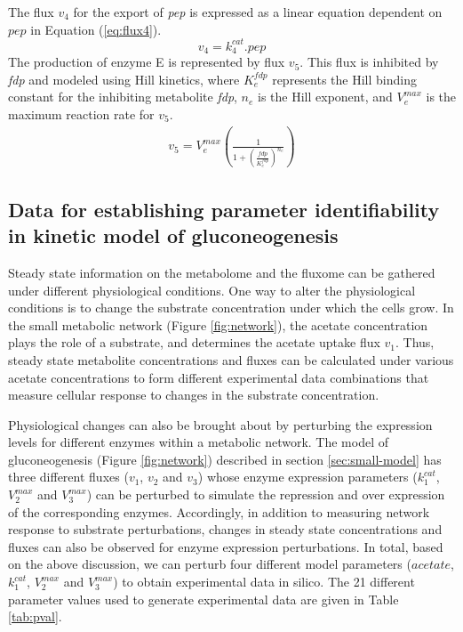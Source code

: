 \documentclass[10pt]{article}
\begin{document}
	The flux $v_4$ for the export of \textit{pep} is expressed as a linear equation dependent on $pep$ in Equation (\ref{eq:flux4}).
	\begin{equation}\label{eq:flux4}
	v_4 = k_{4}^{cat}.pep
	\end{equation}		
	The production of enzyme E is represented by flux $v_5$. This flux is inhibited by \textit{fdp} and modeled using Hill kinetics, where $K_e^{fdp}$ represents the Hill binding constant for the inhibiting metabolite \textit{fdp}, $n_e$ is the Hill exponent, and $V_e^{max}$ is the maximum reaction rate for $v_5$.
	\begin{align}\label{eq:flux5}
	v_5 = V_e^{max}\left(\frac{1}{1+\left(\frac{fdp}{K_{e}^{fdp}}\right)^{n_e}}\right)
	\end{align}
	
	\subsection{Data for establishing parameter identifiability in kinetic model of gluconeogenesis}\label{sec:experiments}
	Steady state information on the metabolome and the fluxome can be gathered under different physiological conditions. One way to alter the physiological conditions is to change the substrate concentration under which the cells grow. In the small metabolic network (Figure \ref{fig:network}), the acetate concentration plays the role of a substrate, and  determines the acetate uptake flux $v_1$. Thus, steady state metabolite concentrations and fluxes can be calculated under various acetate concentrations to form different experimental data combinations that measure cellular response to changes in the substrate concentration. 
	
	Physiological changes can also be brought about by perturbing the expression levels for different enzymes within a metabolic network. The model of gluconeogenesis (Figure \ref{fig:network}) described in section \ref{sec:small-model} has three different fluxes ($v_1$, $v_2$ and $v_3$) whose enzyme expression parameters ($k_1^{cat}$, $V_2^{max}$ and $V_3^{max}$) can be perturbed to simulate the repression and over expression of the corresponding enzymes. Accordingly, in addition to measuring network response to substrate perturbations, changes in steady state concentrations and fluxes can also be observed for enzyme expression perturbations. In total, based on the above discussion, we can perturb four different model parameters ($acetate$, $k_1^{cat}$, $V_2^{max}$ and $V_3^{max}$) to obtain experimental data in silico. The 21 different parameter values used to generate experimental data are given in Table \ref{tab:pval}.	
	
\end{document}
